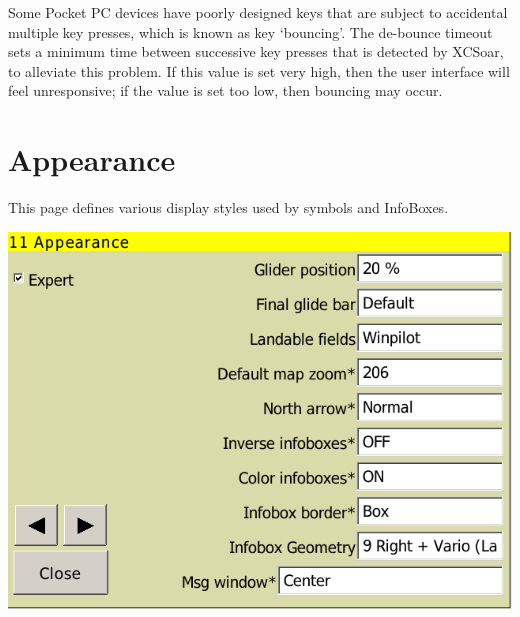 \documentclass[a4paper,12pt]{refrep}
\begin{document}
Some Pocket PC devices have poorly designed keys that are subject to
accidental multiple key presses, which is known as key `bouncing'.  The
de-bounce timeout sets a minimum time between successive key presses
that is detected by XCSoar, to alleviate this problem.  If this value
is set very high, then the user interface will feel unresponsive; if
the value is set too low, then bouncing may occur.

\clearpage
\section{Appearance}

This page defines various display styles used by symbols and InfoBoxes.

\begin{center}
\includegraphics[angle=0,width=\linewidth,keepaspectratio='true']{figures/config-9.png}
\end{center}
\end{document}
